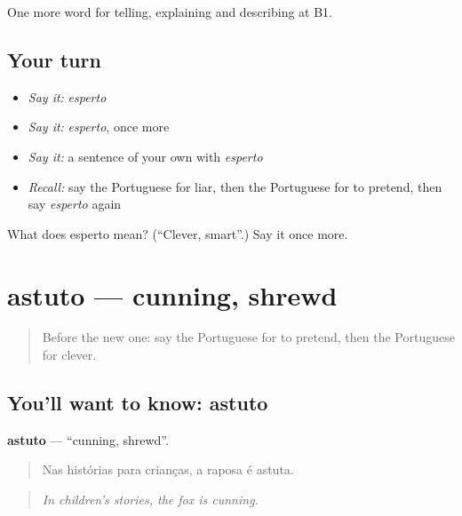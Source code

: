 \begin{grammarlens}[title={What you've built}]
One more word for telling, explaining and describing at B1.
\end{grammarlens}

\subsection*{Your turn}
\begin{itemize}
\raggedright
  \item \emph{Say it:} \emph{esperto}
  \item \emph{Say it:} \emph{esperto}, once more
  \item \emph{Say it:} a sentence of your own with \emph{esperto}
  \item \emph{Recall:} say the Portuguese for liar, then the Portuguese for to pretend, then say \emph{esperto} again
\end{itemize}

\begin{tcolorbox}[breakable,colback=teal!4,colframe=teal!35!black,title={Before you move on}]
What does esperto mean? (\textquotedblleft{}Clever, smart\textquotedblright{}.) Say it once more.
\end{tcolorbox}
\section[astuto]{astuto — cunning, shrewd}

\label{lesson:PT-C472-astuto}



\begin{quote}
Before the new one: say the Portuguese for to pretend, then the Portuguese for clever.
\end{quote}

\subsection*{You'll want to know: astuto}
\textbf{astuto} — \textquotedblleft{}cunning, shrewd\textquotedblright{}.

\begin{quote}
Nas histórias para crianças, a raposa é astuta.
\end{quote}

\begin{quote}
\emph{In children's stories, the fox is cunning.}
\end{quote}

